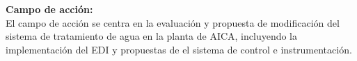 \textbf{Campo de acción:}\\
El campo de acción se centra en la evaluación y propuesta de
modificación del sistema de tratamiento de agua en la planta de
AICA, incluyendo la implementación del EDI y propuestas
de el sistema de control e instrumentación.

